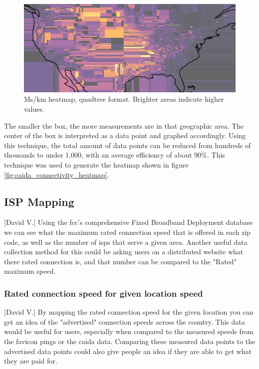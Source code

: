 \documentclass[12pt]{article}
\begin{document}
\begin{figure}[H]
    \centering
    \includegraphics[width=\textwidth]{images/caida_connect_quadplot.png}
    \caption{Ms/km heatmap, quadtree format. Brighter areas indicate higher values.}
    \label{fig:caida_quadplot}
\end{figure}

The smaller the box, the more measurements are in that geographic area. The center of the box is interpreted as a data point and graphed accordingly. Using this technique, the total amount of data points can be reduced from hundreds of thousands to under 1,000, with an average efficiency of about 90\%. This technique was used to generate the heatmap shown in figure \ref{fig:caida_connectivity_heatmap}.

\subsection{ISP Mapping}[David V.]
Using the \acrfull{fcc}'s comprehensive Fixed Broadband Deployment database \cite{FixedMap} we can see what the maximum rated connection speed that is offered in each zip code, as well as the number of \acrshort{isp}s that serve a given area. Another useful data collection method  for this could be asking users on a distributed website what there rated connection is, and that number can be compared to the "Rated" maximum speed. 

\subsubsection{Rated connection speed for given location speed}[David V.]
By mapping the rated connection speed for the given location you can get an idea of the "advertised" connection speeds across the country. This data would be useful for users, especially when compared to the measured speeds from the favicon pings or the \acrshort{caida} data. Comparing these measured data points to the advertised data points could also give people an idea if they are able to get what they are paid for.  
\end{document}
